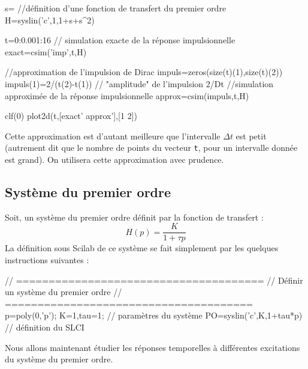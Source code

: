 \begin{Scilabcode}
s=%
//définition d'une fonction de transfert du premier ordre
H=syslin('c',1,1+s+s^2)

t=0:0.001:16
// simulation exacte de la réponse impulsionnelle
exact=csim('imp',t,H)

//approximation de l'impulsion de Dirac
impuls=zeros(size(t)(1),size(t)(2))
impuls(1)=2/(t(2)-t(1))  // "amplitude" de l'impulsion 2/Dt  
//simulation approximée de la réponse impulsionnelle
approx=csim(impuls,t,H)

clf(0)
plot2d(t,[exact' approx'],[1 2])
\end{Scilabcode}

Cette approximation est d'autant meilleure que l'intervalle $\Delta t$ est 
petit (autrement dit que le nombre de points du vecteur \verb?t?, pour un 
intervalle donnée est grand). On utilisera cette approximation avec prudence.

\subsection{Système du premier ordre}
Soit, un système du premier ordre définit par la fonction de transfert : 
$$
H(p)=\dfrac{K}{1+\tau p }
$$
La définition sous Scilab de ce système se fait simplement par les quelques 
instructions suivantes :
\begin{Scilabcode}
// ======================================
//  Définir un système du premier ordre
// ======================================
p=poly(0,'p');
K=1,tau=1;                    // paramètres du système
PO=syslin('c',K,1+tau*p)      // définition du SLCI
\end{Scilabcode}

Nous allons maintenant étudier les réponses temporelles 
à différentes excitations du système du premier ordre.
